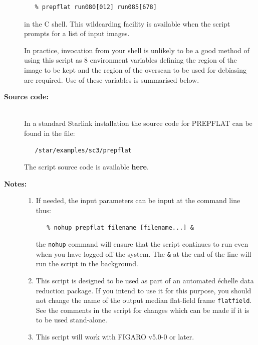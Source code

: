 \documentclass[twoside,11pt]{article}
\newcommand{\htmlref}[2]{#1}
\newenvironment{latexonly}{}{}
\newcommand{\xref}[3]{#1}
\renewcommand{\_}{\texttt{\symbol{95}}}
\begin{document}
\begin{description}
\begin{verbatim}
   % prepflat run080[012] run085[678]
\end{verbatim}

     in the C shell.  This wildcarding facility is available when the
     script prompts for a list of input images.

     In practice, invocation from your shell is unlikely to be a good
     method of using this script as 8 environment variables defining
     the region of the image to be kept and the region of the overscan
     to be used for debiasing are required.  Use of these variables is
     summarised below.

\item [{\bf Source code:}] \mbox{} \\
\begin{latexonly}
In a standard Starlink installation the source code for PREPFLAT can be found
in the file:
\begin{verbatim}
   /star/examples/sc3/prepflat
\end{verbatim}
\end{latexonly}
\begin{htmlonly}
      The script source code is available
      \htmlref{{\bf here}}{se_prepflat_source}.
\end{htmlonly}

\item [{\bf Notes:}] \mbox{}
\begin{enumerate}
\item If needed, the input parameters can be input at the command
      line thus:

\begin{verbatim}
   % nohup prepflat filename [filename...] &
\end{verbatim}

      the \verb+nohup+ command will ensure that the script continues
      to run even when you have logged off the system.  The \verb+&+ at
      the end of the line will run the script in the background.

\item This script is designed to be used as part of an automated
      \'{e}chelle data reduction package.  If you intend to use it
      for this purpose, you should not change the name of the output
      median flat-field frame \verb+flatfield+.  See the comments in the
      script for changes which can be made if it is to be used
      stand-alone.

\item This script will work with \xref{FIGARO}{sun86}{} v5.0-0 or later.


\end{enumerate}
\end{description}
\end{document}
